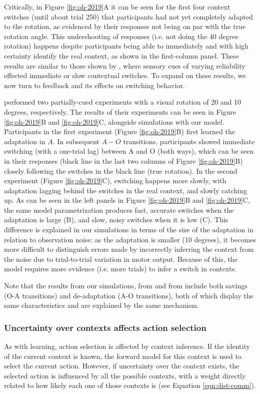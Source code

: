 \documentclass[a4paper,doc,floatsintext,natbib]{apa6}%
\def \fref #1{Figure \ref{#1}}     %
\def \eref #1{Equation \ref{#1}}   %
\begin{document}
Critically, in \fref{fig:oh-2019}A it can be seen for the first four context switches (until about trial 250) that participants had not yet completely adapted to the rotation, as evidenced by their responses not being on par with the true rotation angle. This undershooting of responses (i.e. not doing the 40 degree rotation) happens despite participants being able to immediately and with high certainty identify the real context, as shown in the first-column panel. These results are similar to those shown by \cite{Imamizu_Explicit_2007}, where sensory cues of varying reliability effected immediate or slow contextual switches. To expand on these results, we now turn to feedback and its effects on switching behavior.

\cite{Oh_Minimizing_2019} performed two partially-cued experiments with a visual rotation of 20 and 10 degrees, respectively. The results of their experiments can be seen in \fref{fig:oh-2019}B and \ref{fig:oh-2019}C, alongside simulations with our model. Participants in the first experiment (\fref{fig:oh-2019}B) first learned the adaptation in $A$. In subsequent $A - O$ transitions, participants showed immediate switching (with a one-trial lag) between A and O (both ways), which can be seen in their responses (black line in the last two columns of \fref{fig:oh-2019}B) closely following the switches in the black line (true rotation). In the second experiment (\fref{fig:oh-2019}C), switching happens more slowly, with adaptation lagging behind the switches in the real context, and slowly catching up. As can be seen in the left panels in \fref{fig:oh-2019}B and \ref{fig:oh-2019}C, the same model parametrization produces fast, accurate switches when the adaptation is large (B), and slow, noisy switches when it is low (C). This difference is explained in our simulations in terms of the size of the adaptation in relation to observation noise: as the adaptation is smaller (10 degrees), it becomes more difficult to distinguish errors made by incorrectly inferring the context from the noise due to trial-to-trial variation in motor output. Because of this, the model requires more evidence (i.e. more trials) to infer a switch in contexts.

Note that the results from our simulations, from \cite{Oh_Minimizing_2019} and from \cite{Kim_Neural_2015} include both savings (O-A transitions) and de-adaptation (A-O transitions), both of which display the same characteristics and are explained by the same mechanism.

\subsubsection{Uncertainty over contexts affects action selection}
As with learning, action selection is affected by context inference. If the identity of the current context is known, the forward model for this context is used to select the current action. However, if uncertainty over the context exists, the selected action is influenced by all the possible contexts, with a weight directly related to how likely each one of those contexts is (see \eref{eqn:dist-comm}).
\end{document}
